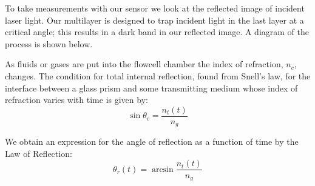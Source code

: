 \documentclass{report}
\begin{document}
			\par{To take measurements with our sensor we look at the reflected image of incident laser light. Our multilayer is designed to trap incident light in the last layer at a critical angle; this results in a dark band in our reflected image. A diagram of the process is shown below.}
\newline	
	\begin{figure}[h!]
	\end{figure}

	\par{As fluids or gases are put into the flowcell chamber the index of refraction, $n_c$, changes. The condition for total internal reflection, found from Snell's law, for the interface between a glass prism and some transmitting medium whose index of refraction varies with time is given by:}
	\[
			\sin{\theta_c} = \frac{n_t(t)}{n_g}
	\]

	\par{We obtain an expression for the angle of reflection as a function of time by the Law of Reflection:}
	\[
			\theta_r(t) = \arcsin{\frac{n_t(t)}{n_g}}
	\]
\end{document}
